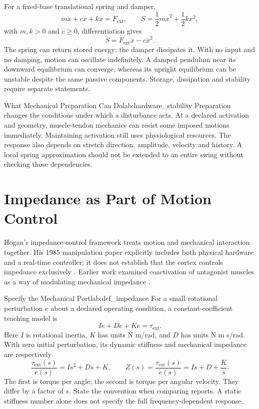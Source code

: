 For a fixed-base translational spring and damper,
\[
m\ddot x+c\dot x+kx=F_{\mathrm{ext}},\qquad
S=\frac12m\dot x^2+\frac12kx^2,
\]
with $m,k>0$ and $c\geq0$, differentiation gives
\[
\dot S=F_{\mathrm{ext}}\dot x-c\dot x^2.
\]
The spring can return stored energy; the damper dissipates it. With no input and no damping, motion can oscillate indefinitely. A damped pendulum near its downward equilibrium can converge, whereas its upright equilibrium can be unstable despite the same passive components. Storage, dissipation and stability require separate statements.

\begin{laymansbox}{What Mechanical Preparation Can Do}{lab:hardware_stability}
Preparation changes the conditions under which a disturbance acts. At a declared activation and geometry, muscle-tendon mechanics can resist some imposed motions immediately. Maintaining activation still uses physiological resources. The response also depends on stretch direction, amplitude, velocity and history. A local spring approximation should not be extended to an entire swing without checking those dependencies.
\end{laymansbox}

\section{Impedance as Part of Motion Control}
\label{sec:impedance_control}

Hogan's impedance-control framework treats motion and mechanical interaction together. His 1985 manipulation paper explicitly includes both physical hardware and a real-time controller; it does not establish that the cortex controls impedance exclusively \citep{hogan1985impedance}. Earlier work examined coactivation of antagonist muscles as a way of modulating mechanical impedance \citep{Hogan:1984}.

\begin{definition}{Specify the Mechanical Port}{lab:def_impedance}
For a small rotational perturbation $e$ about a declared operating condition, a constant-coefficient teaching model is
\[
I\ddot e+D\dot e+Ke=\tau_{\mathrm{ext}}.
\]
Here $I$ is rotational inertia, $K$ has units N m/rad, and $D$ has units N m s/rad. With zero initial perturbation, its dynamic stiffness and mechanical impedance are respectively
\[
\frac{\tau_{\mathrm{ext}}(s)}{e(s)}=Is^2+Ds+K,
\qquad
Z(s)=\frac{\tau_{\mathrm{ext}}(s)}{\dot e(s)}=Is+D+\frac{K}{s}.
\]
The first is torque per angle; the second is torque per angular velocity. They differ by a factor of $s$. State the convention when comparing reports. A static stiffness number alone does not specify the full frequency-dependent response.
\end{definition}

